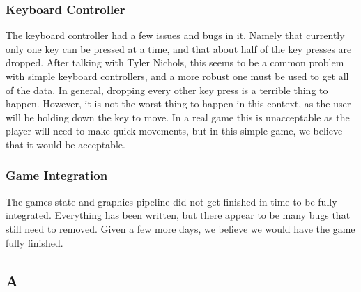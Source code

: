\documentclass[onecolumn]{IEEEtran}
\begin{document}
\subsection{Keyboard Controller}
The keyboard controller had a few issues and bugs in it.  Namely that currently only one key can be pressed at a time, and that about half of the key presses are dropped.  After talking with Tyler Nichols, this seems to be a common problem with simple keyboard controllers, and a more robust one must be used to get all of the data.  In general, dropping every other key press is a terrible thing to happen.  However, it is not the worst thing to happen in this context, as the user will be holding down the key to move.  In a real game this is unacceptable as the player will need to make quick movements, but in this simple game, we believe that it would be acceptable.

\subsection{Game Integration}
The games state and graphics pipeline did not get finished in time to be fully integrated.  Everything has been written, but there appear to be many bugs that still need to removed.  Given a few more days, we believe we would have the game fully finished.




\appendix
\begin{center}
\chapter{A}
\end{center}

%

\end{document}
